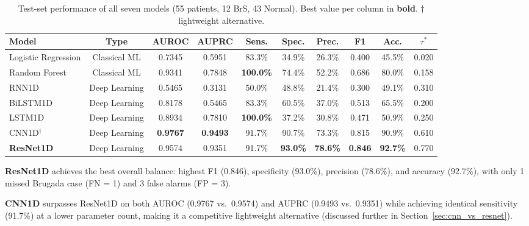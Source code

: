 \documentclass[journal, 10pt, twoside]{IEEEtran}
\begin{document}
\begin{table}[t]
  \centering
  \caption{Test-set performance of all seven models (55 patients, 12 BrS, 43 Normal).
           Best value per column in \textbf{bold}. $\dagger$ lightweight alternative.}
  \label{tab:results}
  \renewcommand{\arraystretch}{1.25}
  \begin{tabular}{lccccccccc}
    \toprule
    \textbf{Model} & \textbf{Type}
      & \textbf{AUROC} & \textbf{AUPRC}
      & \textbf{Sens.} & \textbf{Spec.}
      & \textbf{Prec.} & \textbf{F1}
      & \textbf{Acc.}  & \textbf{$\tau^*$} \\
    \midrule
    Logistic Regression & Classical ML
      & 0.7345 & 0.5951
      & 83.3\% & 34.9\%
      & 26.3\% & 0.400
      & 45.5\% & 0.020 \\
    Random Forest & Classical ML
      & 0.9341 & 0.7848
      & \textbf{100.0\%} & 74.4\%
      & 52.2\% & 0.686
      & 80.0\% & 0.158 \\
    \midrule
    RNN1D & Deep Learning
      & 0.5465 & 0.3131
      & 50.0\% & 48.8\%
      & 21.4\% & 0.300
      & 49.1\% & 0.310 \\
    BiLSTM1D & Deep Learning
      & 0.8178 & 0.5465
      & 83.3\% & 60.5\%
      & 37.0\% & 0.513
      & 65.5\% & 0.200 \\
    LSTM1D & Deep Learning
      & 0.8934 & 0.7810
      & \textbf{100.0\%} & 37.2\%
      & 30.8\% & 0.471
      & 50.9\% & 0.250 \\
    CNN1D$^\dagger$ & Deep Learning
      & \textbf{0.9767} & \textbf{0.9493}
      & 91.7\% & 90.7\%
      & 73.3\% & 0.815
      & 90.9\% & 0.610 \\
    \textbf{ResNet1D} & Deep Learning
      & 0.9574 & 0.9351
      & 91.7\% & \textbf{93.0\%}
      & \textbf{78.6\%} & \textbf{0.846}
      & \textbf{92.7\%} & 0.770 \\
    \bottomrule
  \end{tabular}
\end{table}

\textbf{ResNet1D} achieves the best overall balance:
highest F1 (0.846), specificity (93.0\%), precision (78.6\%),
and accuracy (92.7\%), with only 1 missed Brugada case (FN = 1)
and 3 false alarms (FP = 3).

\textbf{CNN1D} surpasses ResNet1D on both AUROC (0.9767 vs.\ 0.9574)
and AUPRC (0.9493 vs.\ 0.9351) while achieving identical sensitivity
(91.7\%) at a lower parameter count, making it a competitive lightweight
alternative (discussed further in Section~\ref{sec:cnn_vs_resnet}).
\end{document}
